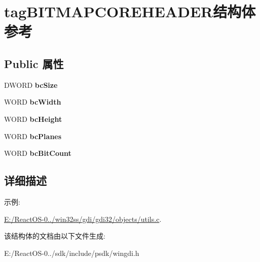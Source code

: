 \hypertarget{structtag_b_i_t_m_a_p_c_o_r_e_h_e_a_d_e_r}{}\section{tag\+B\+I\+T\+M\+A\+P\+C\+O\+R\+E\+H\+E\+A\+D\+E\+R结构体 参考}
\label{structtag_b_i_t_m_a_p_c_o_r_e_h_e_a_d_e_r}
\subsection*{Public 属性}
\begin{DoxyCompactItemize}
\item 
\mbox{\label{structtag_b_i_t_m_a_p_c_o_r_e_h_e_a_d_e_r_a8cde3d3600a4a01c9252771e057d35d0}} 
D\+W\+O\+RD {\bfseries bc\+Size}
\item 
\mbox{\label{structtag_b_i_t_m_a_p_c_o_r_e_h_e_a_d_e_r_ae66f76434d8b368fbf549a6d8a7a7443}} 
W\+O\+RD {\bfseries bc\+Width}
\item 
\mbox{\label{structtag_b_i_t_m_a_p_c_o_r_e_h_e_a_d_e_r_a89deeba2fd9707098ce956d3bf5cc4eb}} 
W\+O\+RD {\bfseries bc\+Height}
\item 
\mbox{\label{structtag_b_i_t_m_a_p_c_o_r_e_h_e_a_d_e_r_a65e32915569cf4156816fe47e30eccf7}} 
W\+O\+RD {\bfseries bc\+Planes}
\item 
\mbox{\label{structtag_b_i_t_m_a_p_c_o_r_e_h_e_a_d_e_r_a86ae8dc45f449281baed049d1c794c98}} 
W\+O\+RD {\bfseries bc\+Bit\+Count}
\end{DoxyCompactItemize}


\subsection{详细描述}
\begin{Desc}
\item[示例\+: ]\par
\hyperlink{_e_1_2_react_o_s-0_84_86_2win32ss_2gdi_2gdi32_2objects_2utils_8c-example}{E\+:/\+React\+O\+S-\/0../win32ss/gdi/gdi32/objects/utils.\+c}.\end{Desc}


该结构体的文档由以下文件生成\+:\begin{DoxyCompactItemize}
\item 
E\+:/\+React\+O\+S-\/0../sdk/include/psdk/wingdi.\+h\end{DoxyCompactItemize}
